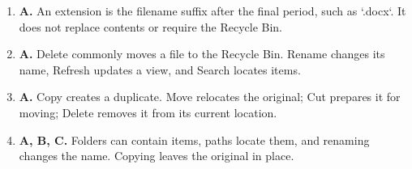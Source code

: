 \begin{enumerate}[label=\textbf{Q\arabic*.}, leftmargin=*]
\item \textbf{A.} An extension is the filename suffix after the final period, such as `.docx`. It does not replace contents or require the Recycle Bin.

\item \textbf{A.} Delete commonly moves a file to the Recycle Bin. Rename changes its name, Refresh updates a view, and Search locates items.

\item \textbf{A.} Copy creates a duplicate. Move relocates the original; Cut prepares it for moving; Delete removes it from its current location.

\item \textbf{A, B, C.} Folders can contain items, paths locate them, and renaming changes the name. Copying leaves the original in place.

\end{enumerate}
